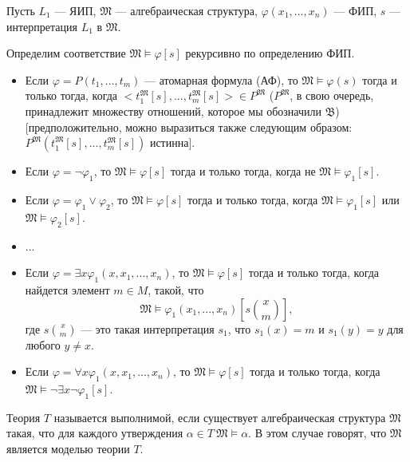     \begin{Def}
        Пусть $L_1$ --- ЯИП, $\mathfrak{M}$ --- алгебраическая структура, $\varphi(x_1, ..., x_n)$ --- ФИП, $s$ --- интерпретация $L_1$ в $\mathfrak{M}$.

        Определим соответствие $\mathfrak{M} \models \varphi[s]$ рекурсивно по определению ФИП.
        \begin{itemize}
            \item Если $\varphi = P(t_1, ..., t_m)$ --- атомарная формула (АФ), то $\mathfrak{M} \models \varphi(s)$ тогда и только тогда, когда $<t_1^{\mathfrak{M}}[s], ..., t_m^{\mathfrak{M}}[s]> \in P^{\mathfrak{M}}$ ($P^{\mathfrak{M}}$, в свою очередь, принадлежит множеству отношений, которое мы обозначили $\mathfrak{B}$) [предположительно, можно выразиться также следующим образом: $P^{\mathfrak{M}}(t_1^{\mathfrak{M}}[s], ..., t_m^{\mathfrak{M}}[s])$ истинна]. 
            \item Если $\varphi = \neg \varphi_1$, то $\mathfrak{M} \models \varphi[s]$ тогда и только тогда, когда не $\mathfrak{M} \models \varphi_1[s]$.
            \item Если $\varphi = \varphi_1 \vee \varphi_2$, то $\mathfrak{M} \models \varphi[s]$ тогда и только тогда, когда $\mathfrak{M} \models \varphi_1[s]$ или $\mathfrak{M} \models \varphi_2[s]$.
            \item ...
            \item Если $\varphi = \exists x \varphi_1(x, x_1, ..., x_n)$, то $\mathfrak{M} \models \varphi[s]$ тогда и только тогда, когда найдется элемент $m \in M$, такой, что $$\mathfrak{M} \models \varphi_1(x_1, ..., x_n)[s \binom{x}{m}],$$ где $s \binom{x}{m}$ --- это такая интерпретация $s_1$, что $s_1(x) = m$ и $s_1(y) = y$ для любого $y \neq x$.
            \item Если $\varphi = \forall x \varphi_1(x, x_1, ..., x_n)$, то $\mathfrak{M} \models \varphi[s]$ тогда и только тогда, когда $\mathfrak{M} \models \neg \exists x \neg \varphi_1[s]$.
        \end{itemize}
    \end{Def}

    \begin{Def}
        Теория $T$ называется выполнимой, если существует алгебраическая структура $\mathfrak{M}$ такая, что для каждого утверждения $\alpha \in T \ \mathfrak{M} \models \alpha$. В этом случае говорят, что $\mathfrak{M}$ является моделью теории $T$.
    \end{Def}
    
